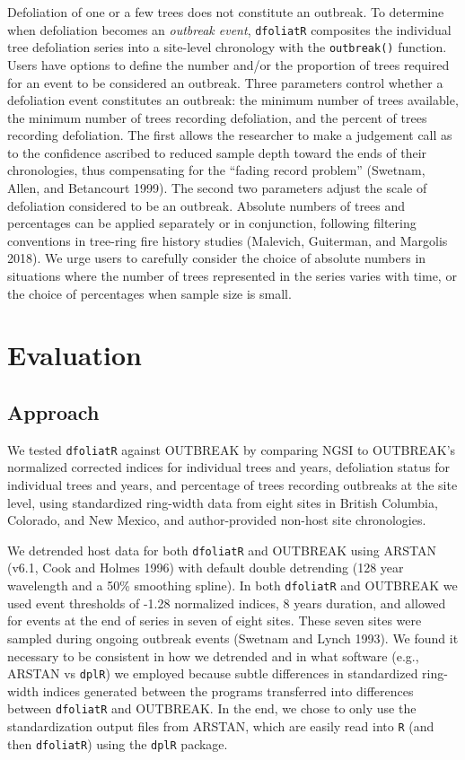 \documentclass[review]{elsarticle} %
\begin{document}
Defoliation of one or a few trees does not constitute an outbreak. To determine when defoliation becomes an \emph{outbreak event}, \texttt{dfoliatR} composites the individual tree defoliation series into a site-level chronology with the \texttt{outbreak()} function. Users have options to define the number and/or the proportion of trees required for an event to be considered an outbreak. Three parameters control whether a defoliation event constitutes an outbreak: the minimum number of trees available, the minimum number of trees recording defoliation, and the percent of trees recording defoliation. The first allows the researcher to make a judgement call as to the confidence ascribed to reduced sample depth toward the ends of their chronologies, thus compensating for the ``fading record problem'' (Swetnam, Allen, and Betancourt 1999). The second two parameters adjust the scale of defoliation considered to be an outbreak. Absolute numbers of trees and percentages can be applied separately or in conjunction, following filtering conventions in tree-ring fire history studies (Malevich, Guiterman, and Margolis 2018). We urge users to carefully consider the choice of absolute numbers in situations where the number of trees represented in the series varies with time, or the choice of percentages when sample size is small.

\hypertarget{evaluation}{%
\section{Evaluation}\label{evaluation}}

\hypertarget{approach}{%
\subsection{Approach}\label{approach}}

We tested \texttt{dfoliatR} against OUTBREAK by comparing NGSI to OUTBREAK's normalized corrected indices for individual trees and years, defoliation status for individual trees and years, and percentage of trees recording outbreaks at the site level, using standardized ring-width data from eight sites in British Columbia, Colorado, and New Mexico, and author-provided non-host site chronologies.

We detrended host data for both \texttt{dfoliatR} and OUTBREAK using ARSTAN (v6.1, Cook and Holmes 1996) with default double detrending (128 year wavelength and a 50\% smoothing spline). In both \texttt{dfoliatR} and OUTBREAK we used event thresholds of -1.28 normalized indices, 8 years duration, and allowed for events at the end of series in seven of eight sites. These seven sites were sampled during ongoing outbreak events (Swetnam and Lynch 1993). We found it necessary to be consistent in how we detrended and in what software (e.g., ARSTAN vs \texttt{dplR}) we employed because subtle differences in standardized ring-width indices generated between the programs transferred into differences between \texttt{dfoliatR} and OUTBREAK. In the end, we chose to only use the standardization output files from ARSTAN, which are easily read into \texttt{R} (and then \texttt{dfoliatR}) using the \texttt{dplR} package.
\end{document}
